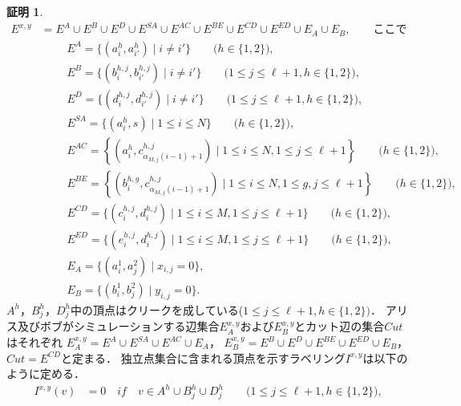 \documentclass[12pt]{thesis}
\theoremstyle{definition}
\newtheorem*{prf*}{証明}
\begin{document}
\begin{prf*}
\begin{align*}
E^{x,y} &= E^{A} \cup E^{B} \cup E^{D} \cup E^{SA} \cup E^{AC} 
\cup E^{BE} \cup E^{CD} \cup E^{ED} \cup E_{A} \cup E_{B}, \quad \quad \text{ここで}\\
&\phantom{=} \quad E^{A} = \{(a^{h}_{i}, a^{h}_{i'})  \mid i \neq i'\} \quad \quad \text{($h \in \{1, 2\}$)}, \\
&\phantom{=} \quad E^{B} = \{(b^{h,j}_{i}, b^{h,j}_{i'})  \mid i \neq i'\} \quad \quad \text{($1\leq j \leq \ell+1, h \in \{1, 2\}$)}, \\
&\phantom{=} \quad E^{D} = \{(d^{h,j}_{i}, d^{h,j}_{i'})  \mid i \neq i'\} \quad \quad \text{($1\leq j \leq \ell+1, h \in \{1, 2\}$)}, \\
&\phantom{=} \quad E^{SA} = \{(a^{h}_{i}, s) \mid 1\leq i \leq N\}  \quad \quad \text{($h \in \{1, 2\}$)}, \\
&\phantom{=} \quad E^{AC} = \left\{ \left(a^{h}_{i},c^{h,j}_{\alpha_{M,j}(i-1)+1}\right) \mid 1\leq i \leq N,1\leq j \leq \ell+1\right\} \quad \quad \text{($h \in \{1, 2\}$)}, \\
&\phantom{=} \quad E^{BE} = \left\{ \left(b^{h,g}_{i},c^{h,j}_{\alpha_{M,j}(i-1)+1}\right) \mid 1\leq i \leq N,1\leq g,j \leq \ell+1\right\} \quad \quad \text{($h \in \{1, 2\}$)}, \\
&\phantom{=} \quad E^{CD} = \{(c^{h, j}_{i}, d^{h, j}_{i}) \mid 1\leq i \leq M,1\leq j \leq \ell+1\} \quad \quad \text{($h \in \{1, 2\}$)}, \\
&\phantom{=} \quad E^{ED} = \{(e^{h, j}_{i}, d^{h, j}_{i}) \mid 1\leq i \leq M,1\leq j \leq \ell+1\} \quad \quad \text{($h \in \{1, 2\}$)}, \\
&\phantom{=} \quad E_{A} = \{(a^{1}_{i},a^{2}_{j}) \mid x_{i,j}=0\}, \\
&\phantom{=} \quad E_{B} = \{(b^{1}_{i},b^{2}_{j}) \mid y_{i,j}=0\}.
\end{align*}
$A^{h}$，$B^{h}_{j}$，$D^{h}_{j}$中の頂点はクリークを成している($1\leq j \leq \ell+1, h \in \{1, 2\})$．
アリス及びボブがシミュレーションする辺集合$E^{x,y}_A$および$E^{x,y}_B$とカット辺の集合$\mathit{Cut}$はそれぞれ
$E^{x,y}_{A} = E^{A} \cup E^{SA} \cup E^{AC} \cup E_{A}$，
$E^{x,y}_{B} = E^{B} \cup E^{D} \cup E^{BE} \cup E^{ED} \cup E_{B}$，
$\mathit{Cut} = E^{CD}$と定まる．
独立点集合に含まれる頂点を示すラベリング$I^{x,y}$は以下のように定める．
\begin{align*}
I^{x,y}(v) &= 0 \quad if \quad v \in A^{h} \cup B^{h}_{j} \cup D^{h}_{j} \quad \quad \text{($1\leq j \leq \ell+1, h \in \{1, 2\}$)}, \\

\end{align*}
\end{prf*}
\end{document}
